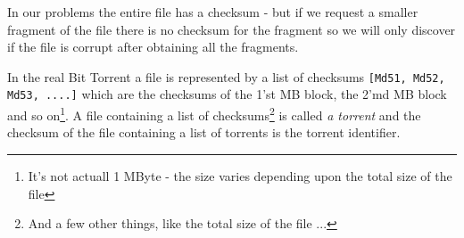 \documentclass[12pt]{hitec}
\begin{document}
In our problems the entire file has a checksum - but if we request a
smaller fragment of the file there is no checksum for the fragment so
we will only discover if the file is corrupt after obtaining all the
fragments.

In the real Bit Torrent a file is represented by a list of checksums
\verb+[Md51, Md52, Md53, ....]+ which are the checksums of the 1'st MB
block, the 2'md MB block and so on\footnote{It's not actuall 1 MByte - the
  size varies depending upon the total size of the file}.  A file containing a list of
checksums\footnote{And a few other things, like the total size of the file ...}
is called {\sl a torrent} and the checksum of the file
containing a list of torrents is the torrent identifier.
\end{document}

